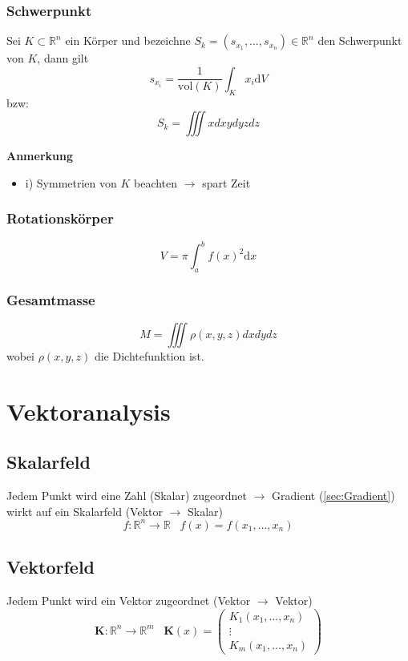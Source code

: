 \documentclass[8pt, a4paper, landscape, fleqn]{scrartcl}
\newenvironment {annotation}[1]
				{\begin{itshape} \begin{small} \textbf{#1} \begin{itemize}}
				{\end{itemize} \end{small} \end{itshape}}
\begin{document}
\begin{multicols*}{3}
				\subsubsection{Schwerpunkt}
					Sei $K \subset \mathbb{R}^n$ ein Körper und bezeichne $S_k=(s_{x_1}, \dots, s_{x_n}) \in \mathbb{R}^n$ den Schwerpunkt von $K$, dann gilt
					\begin{equation*}
						s_{x_i}=\frac{1}{\text{vol}(K)}\int_{K}x_i \text{d}V
					\end{equation*}
					bzw: \[S_k = \iiint xdxydyzdz\]
					\begin{annotation}{Anmerkung}
						\item[i)] Symmetrien von $K$ beachten $\rightarrow$ spart Zeit
					\end{annotation}
				\subsubsection{Rotationskörper}
					\begin{equation*}
						V=\pi \int_{a}^{b}f(x)^2\text{d}x
					\end{equation*}
				\subsubsection{Gesamtmasse}
				    \[M  = \iiint \rho(x,y,z) dxdydz\]
				    wobei $\rho(x,y,z)$ die Dichtefunktion ist.
		\section{Vektoranalysis}
			\subsection{Skalarfeld}
				Jedem Punkt wird eine Zahl (Skalar) zugeordnet $\rightarrow$ Gradient (\ref{sec:Gradient}) wirkt auf ein Skalarfeld (Vektor $\rightarrow$ Skalar)
				\begin{equation*}
					f: \mathbb{R}^n \rightarrow \mathbb{R} \hspace{10pt} f(x)=f(x_1, \dots, x_n)
				\end{equation*}
			\subsection{Vektorfeld}
				Jedem Punkt wird ein Vektor zugeordnet (Vektor $\rightarrow$ Vektor)
				\begin{equation*}
					\textbf{K}: \mathbb{R}^n \rightarrow \mathbb{R}^m \hspace{10pt} \textbf{K}(x)=
					\begin{pmatrix}
						K_1(x_1, \dots, x_n)\\
						\vdots\\
						K_m(x_1, \dots, x_n)
					\end{pmatrix}
				\end{equation*}

\end{multicols*}
\end{document}
